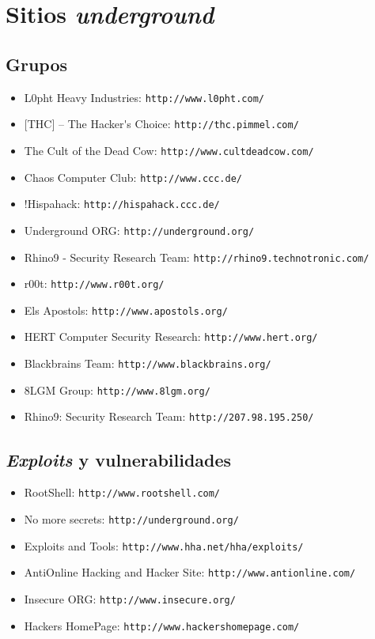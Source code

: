 \section{Sitios {\it underground}}
\subsection{Grupos}
\begin{itemize}
\item L0pht Heavy Industries: {\tt http://www.l0pht.com/}
\item $[$THC$]$ -- The Hacker\'{}s Choice: {\tt http://thc.pimmel.com/}
\item The Cult of the Dead Cow: {\tt http://www.cultdeadcow.com/}
\item Chaos Computer Club: {\tt http://www.ccc.de/}
\item !Hispahack: {\tt http://hispahack.ccc.de/}
\item Underground ORG: {\tt http://underground.org/}
\item Rhino9 - Security Research Team: {\tt http://rhino9.technotronic.com/}
\item r00t: {\tt http://www.r00t.org/}
\item Els Apostols: {\tt http://www.apostols.org/}
\item HERT Computer Security Research: {\tt http://www.hert.org/}
\item Blackbrains Team: {\tt http://www.blackbrains.org/}
\item 8LGM Group: {\tt http://www.8lgm.org/}
\item Rhino9: Security Research Team: {\tt http://207.98.195.250/}
\end{itemize}
\subsection{{\it Exploits} y vulnerabilidades}
\begin{itemize}
\item RootShell: {\tt http://www.rootshell.com/}
\item No more secrets: {\tt http://underground.org/}
\item Exploits and Tools: {\tt http://www.hha.net/hha/exploits/}
\item AntiOnline Hacking and Hacker Site: {\tt http://www.antionline.com/}
\item Insecure ORG: {\tt http://www.insecure.org/}
\item Hackers HomePage: {\tt http://www.hackershomepage.com/}
\end{itemize}
